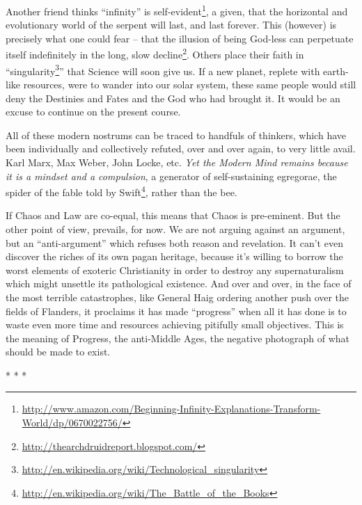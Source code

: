 Another friend thinks ``infinity'' is self-evident\footnote{\url{http://www.amazon.com/Beginning-Infinity-Explanations-Transform-World/dp/0670022756/}}, a given, that the horizontal and evolutionary world of the serpent will last, and last forever. This (however) is precisely what one could fear -- that the illusion of being God-less can perpetuate itself indefinitely in the long, slow decline\footnote{\url{http://thearchdruidreport.blogspot.com/}}. Others place their faith in ``singularity\footnote{\url{http://en.wikipedia.org/wiki/Technological_singularity}}'' that Science will soon give us. If a new planet, replete with earth-like resources, were to wander into our solar system, these same people would still deny the Destinies and Fates and the God who had brought it. It would be an excuse to continue on the present course.

All of these modern nostrums can be traced to handfuls of thinkers, which have been individually and collectively refuted, over and over again, to very little avail. Karl Marx, Max Weber, John Locke, etc. \emph{Yet the Modern Mind remains because it is a mindset and a compulsion}, a generator of self-sustaining egregorae, the spider of the fable told by Swift\footnote{\url{http://en.wikipedia.org/wiki/The_Battle_of_the_Books}}, rather than the bee.

If Chaos and Law are co-equal, this means that Chaos is pre-eminent. But the other point of view, prevails, for now. We are not arguing against an argument, but an ``anti-argument'' which refuses both reason and revelation. It can't even discover the riches of its own pagan heritage, because it's willing to borrow the worst elements of exoteric Christianity in order to destroy any supernaturalism which might unsettle its pathological existence. And over and over, in the face of the most terrible catastrophes, like General Haig ordering another push over the fields of Flanders, it proclaims it has made ``progress'' when all it has done is to waste even more time and resources achieving pitifully small objectives. This is the meaning of Progress, the anti-Middle Ages, the negative photograph of what should be made to exist.



\begin{center}* * *\end{center}

